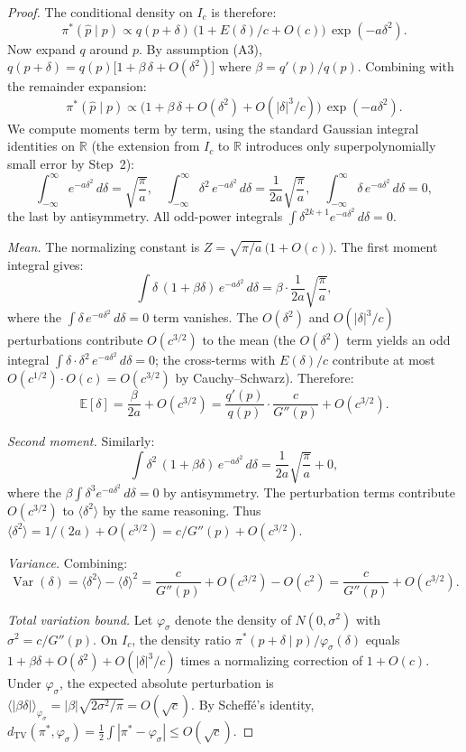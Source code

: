 \documentclass[11pt]{article}
\begin{document}
\begin{proof}
The conditional density on $I_c$ is therefore:
\begin{equation}\label{eq:gaussian-approx}
\pi^*(\hat{p} \mid p) \propto q(p+\delta)\,\big(1 + E(\delta)/c + O(c)\big)\,\exp(-a\delta^2).
\end{equation}
Now expand $q$ around $p$. By assumption (A3), $q(p + \delta) = q(p)\big[1 + \beta\,\delta + O(\delta^2)\big]$ where $\beta = q'(p)/q(p)$. Combining with the remainder expansion:
\[
\pi^*(\hat{p} \mid p) \propto \big(1 + \beta\,\delta + O(\delta^2) + O(|\delta|^3/c)\big)\,\exp(-a\delta^2).
\]
We compute moments term by term, using the standard Gaussian integral identities on $\mathbb{R}$ (the extension from $I_c$ to $\mathbb{R}$ introduces only superpolynomially small error by Step~2):
\[
\int_{-\infty}^{\infty} e^{-a\delta^2}\,d\delta = \sqrt{\frac{\pi}{a}}, \quad \int_{-\infty}^{\infty} \delta^2\,e^{-a\delta^2}\,d\delta = \frac{1}{2a}\sqrt{\frac{\pi}{a}}, \quad \int_{-\infty}^{\infty} \delta\,e^{-a\delta^2}\,d\delta = 0,
\]
the last by antisymmetry. All odd-power integrals $\int \delta^{2k+1} e^{-a\delta^2}\,d\delta = 0$.

\textit{Mean.} The normalizing constant is $Z = \sqrt{\pi/a}\,\big(1 + O(c)\big)$. The first moment integral gives:
\[
\int \delta\,(1 + \beta\delta)\,e^{-a\delta^2}\,d\delta = \beta \cdot \frac{1}{2a}\sqrt{\frac{\pi}{a}},
\]
where the $\int \delta\,e^{-a\delta^2}\,d\delta = 0$ term vanishes. The $O(\delta^2)$ and $O(|\delta|^3/c)$ perturbations contribute $O(c^{3/2})$ to the mean (the $O(\delta^2)$ term yields an odd integral $\int \delta \cdot \delta^2 \,e^{-a\delta^2}\,d\delta = 0$; the cross-terms with $E(\delta)/c$ contribute at most $O(c^{1/2}) \cdot O(c) = O(c^{3/2})$ by Cauchy--Schwarz). Therefore:
\[
\mathbb{E}[\delta] = \frac{\beta}{2a} + O(c^{3/2}) = \frac{q'(p)}{q(p)} \cdot \frac{c}{G''(p)} + O(c^{3/2}).
\]

\textit{Second moment.} Similarly:
\[
\int \delta^2\,(1 + \beta\delta)\,e^{-a\delta^2}\,d\delta = \frac{1}{2a}\sqrt{\frac{\pi}{a}} + 0,
\]
where the $\beta\int \delta^3 e^{-a\delta^2}\,d\delta = 0$ by antisymmetry. The perturbation terms contribute $O(c^{3/2})$ to $\langle \delta^2 \rangle$ by the same reasoning. Thus $\langle \delta^2 \rangle = 1/(2a) + O(c^{3/2}) = c/G''(p) + O(c^{3/2})$.

\textit{Variance.} Combining:
\[
\operatorname{Var}(\delta) = \langle \delta^2 \rangle - \langle \delta \rangle^2 = \frac{c}{G''(p)} + O(c^{3/2}) - O(c^2) = \frac{c}{G''(p)} + O(c^{3/2}).
\]

\textit{Total variation bound.} Let $\varphi_\sigma$ denote the density of $N(0, \sigma^2)$ with $\sigma^2 = c/G''(p)$. On $I_c$, the density ratio $\pi^*(p + \delta \mid p)/\varphi_\sigma(\delta)$ equals $1 + \beta\delta + O(\delta^2) + O(|\delta|^3/c)$ times a normalizing correction of $1 + O(c)$. Under $\varphi_\sigma$, the expected absolute perturbation is $\langle |\beta\delta| \rangle_{\varphi_\sigma} = |\beta|\sqrt{2\sigma^2/\pi} = O(\sqrt{c})$. By Scheff\'e's identity, $d_{\mathrm{TV}}(\pi^*, \varphi_\sigma) = \frac{1}{2}\int |\pi^* - \varphi_\sigma| \leq O(\sqrt{c})$.
\end{proof}
\end{document}

